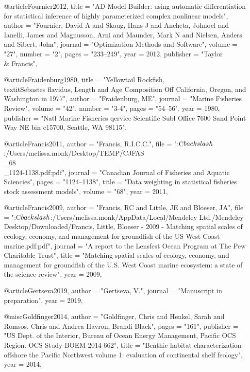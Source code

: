 @article{Fournier2012,
    title = "{AD Model Builder: using automatic differentiation for statistical inference of highly parameterized complex nonlinear models}",
    author = "{Fournier, David A and Skaug, Hans J and Ancheta, Johnoel and Ianelli, James and Magnusson, Arni and Maunder, Mark N and Nielsen, Anders and Sibert, John}",
    journal = "{Optimization Methods and Software}",
    volume = "{27}",
    number = "{2}",
    pages = "{233--249}",
    year = 2012,
    publisher = "{Taylor \\& Francis}",
}

@article{Fraidenburg1980,
    title = "{Yellowtail Rockfish, \\textit{{{Sebastes}} flavidus}, Length and Age Composition Off California, Oregon, and Washington in 1977}",
    author = "{Fraidenburg, ME}",
    journal = "{Marine Fisheries Review}",
    volume = "{42}",
    number = "{3-4}",
    pages = "{54--56}",
    year = 1980,
    publisher = "{Natl Marine Fisheries qervice Scientific Subl Office 7600 Sand Point Way NE bin c15700, Seattle, WA 98115}",
}

@article{Francis2011,
    author = "{Francis, R.I.C.C.}",
    file = "{:C$\\backslash$:/Users/melissa.monk/Desktop/TEMP/CJFAS\\_68\\_1124-1138.pdf:pdf}",
    journal = "{Canadian Journal of Fisheries and Aquatic Sciencies}",
    pages = "{1124--1138}",
    title = "{{Data weighting in statistical fisheries stock assessment models}}",
    volume = "{68}",
    year = 2011,
}

@article{Francis2009,
    author = "{Francis, RC and Little, JE and Bloeser, JA}",
    file = "{:C$\\backslash$:/Users/melissa.monk/AppData/Local/Mendeley Ltd./Mendeley Desktop/Downloaded/Francis, Little, Bloeser - 2009 - Matching spatial scales of ecology, economy, and management for groundfish of the US West Coast marine.pdf:pdf}",
    journal = "{A report to the Lensfest Ocean Program at The Pew Charitable Trust}",
    title = "{{Matching spatial scales of ecology, economy, and management for groundfish of the U.S. West Coast marine ecosystem: a state of the science review}}",
    year = 2009,
}

@article{Gertseva2019,
    author = "{Gertseva, V.}",
    journal = "{Manuscript in preparation}",
    year = 2019,
}

@misc{Goldfinger2014,
    author = "{Goldfinger, Chris and Henkel, Sarah and Romsos, Chris and {Andrea Havron}, Brandi Black}",
    pages = "{161}",
    publisher = "{US Dept. of the Interior, Bureau of Ocean Energy Management, Pacific OCS Region. OCS Study BOEM 2014-662}",
    title = "{{Benthic habitat characterization offshore the Pacific Northwest volume 1: evaluation of continental shelf feology}}",
    year = 2014,
}


